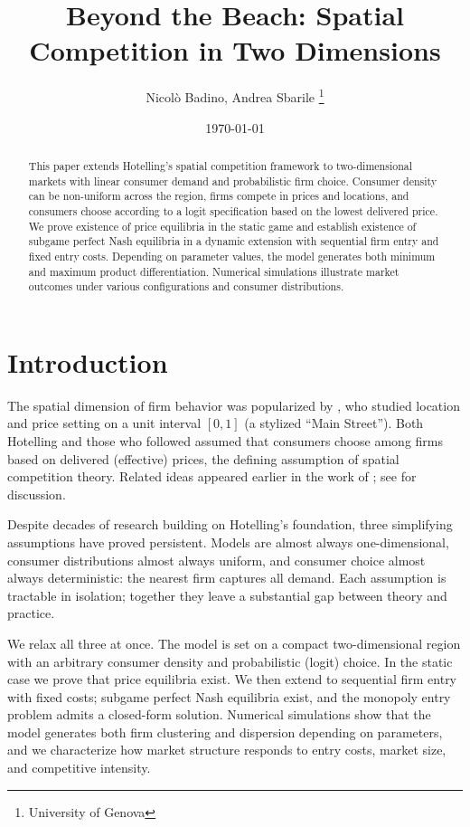 \documentclass{article}
\title{Beyond the Beach: Spatial Competition in Two Dimensions}
\author{Nicol\`{o} Badino, Andrea Sbarile
\thanks{University of Genova}}
\date{\today}
\begin{document}
\maketitle

\begin{abstract}
  This paper extends Hotelling's spatial competition framework to two-dimensional markets with linear consumer demand and probabilistic firm choice. Consumer density can be non-uniform across the region, firms compete in prices and locations, and consumers choose according to a logit specification based on the lowest delivered price.
  We prove existence of price equilibria in the static game and establish existence of subgame perfect Nash equilibria in a dynamic extension with sequential firm entry and fixed entry costs.
  Depending on parameter values, the model generates both minimum and maximum product differentiation. Numerical simulations illustrate market outcomes under various configurations and consumer distributions.
\end{abstract}

\section{Introduction}
\label{sec:introduction}

The spatial dimension of firm behavior was popularized by \citet{hotelling1929}, who studied location and price setting on a unit interval $[0,1]$ (a stylized ``Main Street''). Both Hotelling and those who followed assumed that consumers choose among firms based on delivered (effective) prices, the defining assumption of spatial competition theory. Related ideas appeared earlier in the work of \citet{launhardt1885mathematische}; see \citet{DOSSANTOSFERREIRA1996485} for discussion.

Despite decades of research building on Hotelling's foundation, three simplifying assumptions have proved persistent. Models are almost always one-dimensional, consumer distributions almost always uniform, and consumer choice almost always deterministic: the nearest firm captures all demand. Each assumption is tractable in isolation; together they leave a substantial gap between theory and practice.

We relax all three at once. The model is set on a compact two-dimensional region with an arbitrary consumer density and probabilistic (logit) choice. In the static case we prove that price equilibria exist. We then extend to sequential firm entry with fixed costs; subgame perfect Nash equilibria exist, and the monopoly entry problem admits a closed-form solution. Numerical simulations show that the model generates both firm clustering and dispersion depending on parameters, and we characterize how market structure responds to entry costs, market size, and competitive intensity.
\end{document}
